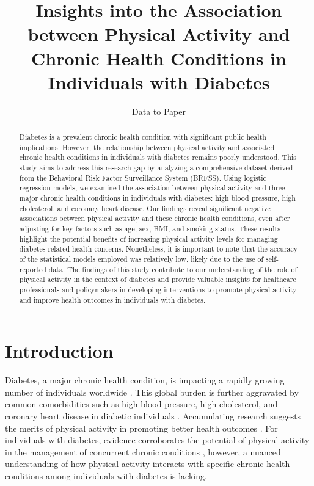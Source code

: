 \documentclass[11pt]{article}
\title{Insights into the Association between Physical Activity and Chronic Health Conditions in Individuals with Diabetes}
\author{Data to Paper}
\begin{document}
\maketitle
\begin{abstract}Diabetes is a prevalent chronic health condition with significant public health implications. However, the relationship between physical activity and associated chronic health conditions in individuals with diabetes remains poorly understood. This study aims to address this research gap by analyzing a comprehensive dataset derived from the Behavioral Risk Factor Surveillance System (BRFSS). Using logistic regression models, we examined the association between physical activity and three major chronic health conditions in individuals with diabetes: high blood pressure, high cholesterol, and coronary heart disease. Our findings reveal significant negative associations between physical activity and these chronic health conditions, even after adjusting for key factors such as age, sex, BMI, and smoking status. These results highlight the potential benefits of increasing physical activity levels for managing diabetes-related health concerns. Nonetheless, it is important to note that the accuracy of the statistical models employed was relatively low, likely due to the use of self-reported data. The findings of this study contribute to our understanding of the role of physical activity in the context of diabetes and provide valuable insights for healthcare professionals and policymakers in developing interventions to promote physical activity and improve health outcomes in individuals with diabetes.\end{abstract}
\section*{Introduction}

Diabetes, a major chronic health condition, is impacting a rapidly growing number of individuals worldwide \cite{Moreira2014PrevalenceOM}. This global burden is further aggravated by common comorbidities such as high blood pressure, high cholesterol, and coronary heart disease in diabetic individuals \cite{Hill2015PhysicalAA, Franssen2020CanCW, Rubin2014ImpactOI, Hamine2015ImpactOM}. Accumulating research suggests the merits of physical activity in promoting better health outcomes \cite{Rosenfeld2017SexdependentDI}. For individuals with diabetes, evidence corroborates the potential of physical activity in the management of concurrent chronic conditions \cite{Santhanakrishnan2014FactorsAC, Polonsky2017TheIO, Thom2013ImpactOP}, however, a nuanced understanding of how physical activity interacts with specific chronic health conditions among individuals with diabetes is lacking.
\end{document}
